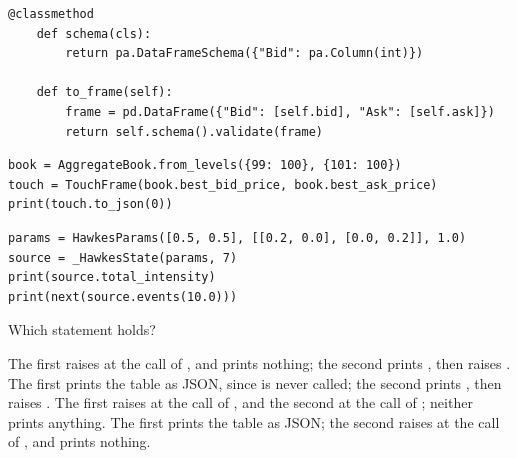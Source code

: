 \begin{question}
\begin{lstlisting}[caption={The touch as a table}, label=listing.abstractMethodRaisesAtInstantiationTouch]
    @classmethod
    def schema(cls):
        return pa.DataFrameSchema({"Bid": pa.Column(int)})

    def to_frame(self):
        frame = pd.DataFrame({"Bid": [self.bid], "Ask": [self.ask]})
        return self.schema().validate(frame)
\end{lstlisting}
\begin{lstlisting}[caption={The first run}, label=listing.abstractMethodRaisesAtInstantiationFirst]
book = AggregateBook.from_levels({99: 100}, {101: 100})
touch = TouchFrame(book.best_bid_price, book.best_ask_price)
print(touch.to_json(0))
\end{lstlisting}
\begin{lstlisting}[caption={The second run}, label=listing.abstractMethodRaisesAtInstantiationSecond]
params = HawkesParams([0.5, 0.5], [[0.2, 0.0], [0.0, 0.2]], 1.0)
source = _HawkesState(params, 7)
print(source.total_intensity)
print(next(source.events(10.0)))
\end{lstlisting}
Which statement holds?
\begin{choices}
 \correctchoice The first raises  at the call of , and prints nothing;
  the second prints , then raises .
 \choice The first prints the table as JSON, since  is never called;
  the second prints , then raises .
 \choice The first raises  at the call of ,
  and the second at the call of ; neither prints anything.
 \choice The first prints the table as JSON;
  the second raises  at the call of , and prints nothing.
\end{choices}
\end{question}
